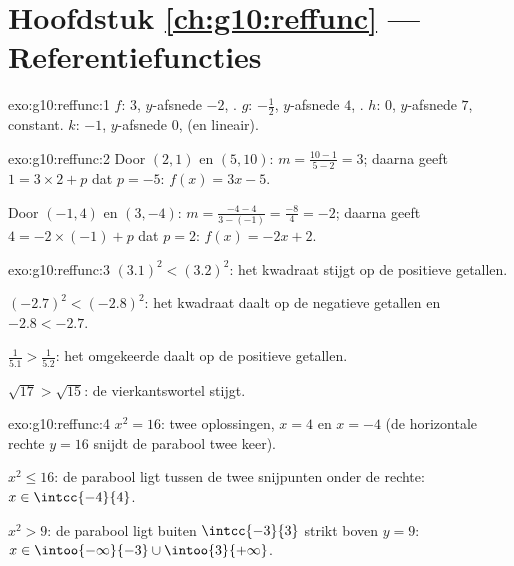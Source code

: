 \section*{Hoofdstuk \ref{ch:g10:reffunc} --- Referentiefuncties}

\begin{solution}{exo:g10:reffunc:1}
$f$:  $3$, $y$-afsnede $-2$, . \quad
$g$:  $-\frac12$, $y$-afsnede $4$, . \quad
$h$:  $0$, $y$-afsnede $7$, constant. \quad
$k$:  $-1$, $y$-afsnede $0$,  (en lineair).
\end{solution}

\begin{solution}{exo:g10:reffunc:2}
Door $(2,1)$ en $(5,10)$: 
$m = \frac{10 - 1}{5 - 2} = 3$; daarna geeft $1 = 3 \times 2 + p$ dat
$p = -5$: $f(x) = 3x - 5$.

Door $(-1,4)$ en $(3,-4)$: 
$m = \frac{-4 - 4}{3 - (-1)} = \frac{-8}{4} = -2$; daarna geeft
$4 = -2 \times (-1) + p$ dat $p = 2$: $f(x) = -2x + 2$.
\end{solution}

\begin{solution}{exo:g10:reffunc:3}
$(3.1)^2 < (3.2)^2$: het kwadraat stijgt op de positieve getallen.

$(-2.7)^2 < (-2.8)^2$: het kwadraat daalt op de negatieve getallen en
$-2.8 < -2.7$.

$\frac{1}{5.1} > \frac{1}{5.2}$: het omgekeerde daalt op de positieve
getallen.

$\sqrt{17} > \sqrt{15}$: de vierkantswortel stijgt.
\end{solution}

\begin{solution}{exo:g10:reffunc:4}
$x^2 = 16$: twee oplossingen, $x = 4$ en $x = -4$ (de horizontale rechte
$y = 16$ snijdt de parabool twee keer).

$x^2 \leq 16$: de parabool ligt tussen de twee snijpunten onder de rechte:
$x \in \intcc{-4}{4}$.

$x^2 > 9$: de parabool ligt buiten $\intcc{-3}{3}$ strikt boven $y = 9$:
$x \in \intoo{-\infty}{-3} \cup \intoo{3}{+\infty}$.
\end{solution}

